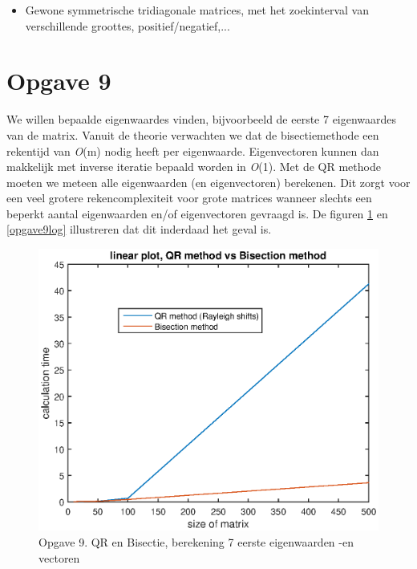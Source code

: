 \documentclass[]{article}
\newcommand{\opgave}[1]{\pagebreak\section*{Opgave #1}}
\begin{document}
\begin{itemize}
	\item Gewone symmetrische tridiagonale matrices, met het zoekinterval van verschillende groottes, positief/negatief,...
\end{itemize}

\opgave{9}
We willen bepaalde eigenwaardes vinden, bijvoorbeeld de eerste 7 eigenwaardes van de matrix. Vanuit de theorie verwachten we dat de bisectiemethode een rekentijd van \textit{O}(m) nodig heeft per eigenwaarde. Eigenvectoren kunnen dan makkelijk met inverse iteratie bepaald worden in \textit{O}(1). \linebreak
Met de QR methode moeten we meteen alle eigenwaarden (en eigenvectoren) berekenen. Dit zorgt voor een veel grotere rekencomplexiteit voor grote matrices wanneer slechts een beperkt aantal eigenwaarden en/of eigenvectoren gevraagd is.
De figuren \ref{opgave9lin} en \ref{opgave9log} illustreren dat dit inderdaad het geval is.

\begin{figure}
\begin{center}
\includegraphics[width=1\textwidth]{opgave9lin.eps}
\end{center}
\caption{Opgave 9. QR en Bisectie, berekening 7 eerste eigenwaarden -en vectoren}
\label{opgave9lin}
\end{figure}
\end{document}
